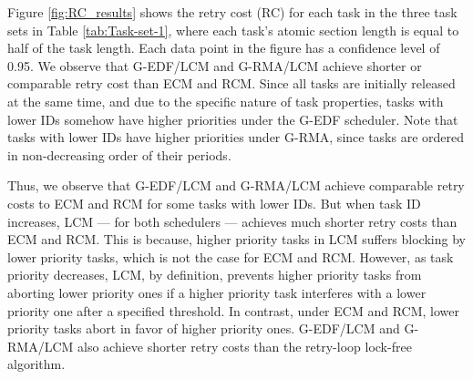 \documentclass{sig-alternate}
\begin{document}
Figure \ref{fig:RC_results} shows the retry cost (RC) 
for each task in the three task sets in Table \ref{tab:Task-set-1}, where each task's atomic section length is equal to half of the task length. Each data point in the figure has a confidence level of 0.95. We observe that G-EDF/LCM and G-RMA/LCM achieve shorter
or comparable retry cost than ECM and RCM. Since all tasks are initially
released at the same time, and due to the specific nature of task properties, tasks with lower IDs somehow have higher priorities under the G-EDF scheduler. Note that tasks with lower IDs have higher priorities under G-RMA, since tasks are ordered in non-decreasing order of their periods. 

Thus, we observe that G-EDF/LCM and G-RMA/LCM achieve comparable retry costs
to ECM and RCM for some tasks with lower IDs. But when task ID increases,
LCM --- for both schedulers --- achieves much shorter retry costs 
than ECM and RCM. 
This is because, higher priority tasks in LCM suffers blocking
by lower priority tasks, which is not the case for ECM and RCM. However, as task priority decreases, LCM, by definition, prevents higher priority
tasks from aborting lower priority ones if a higher priority task
interferes with a lower priority one after a specified threshold. In contrast, under ECM and RCM, lower priority tasks abort in favor of higher priority ones. G-EDF/LCM and G-RMA/LCM also achieve shorter retry costs than the retry-loop lock-free algorithm.
\end{document}
